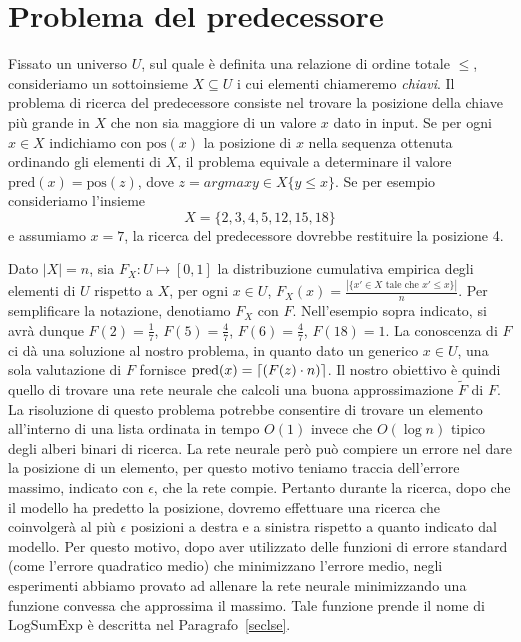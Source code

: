 \documentclass[11pt,a4paper,twoside,
openright]{book}
\DeclarePairedDelimiter{\ceil}{\lceil}{\rceil}
\begin{document}
\section{Problema del predecessore}
Fissato un universo $U$, sul quale è definita una relazione di ordine totale $\leq$, consideriamo un sottoinsieme $X \subseteq U$ i cui elementi chiameremo \emph{chiavi}. Il problema di ricerca del predecessore consiste nel trovare la posizione della chiave più grande in $X$ che non sia maggiore di un valore $x$ dato in input. Se per ogni $x \in X$ indichiamo con $\mathrm{pos}(x)$ la posizione di $x$ nella sequenza ottenuta ordinando gli elementi di $X$, il problema equivale a determinare il valore $\mathrm{pred}(x) = \mathrm{pos}(z)$, dove $z = arg max{y \in X} \{ y \leq x\}$.
Se per esempio consideriamo l'insieme $$\displaystyle{ X=\{2,3,4,5,12,15,18\}}$$ e assumiamo $x=7$, la ricerca del predecessore dovrebbe restituire la posizione 4.

Dato $|X|=n$, sia $F_X: U \mapsto [0, 1]$ la distribuzione cumulativa empirica degli elementi di $U$ rispetto a $X$, per ogni $x\in U$, $F_X(x) = \frac{| \{x' \in X \text{ tale che }x' \leq x\} |}{n}$. Per semplificare la notazione, denotiamo $F_{X}$ con $F$. Nell'esempio sopra indicato, si avrà dunque $F(2)=\frac{1}{7}$, $F(5)=\frac{4}{7}$, $F(6)=\frac{4}{7}$, $F(18)=1$. La conoscenza di $F$ ci dà una soluzione al nostro problema, in quanto dato un generico $x \in U$, una sola valutazione di $F$ fornisce $\mathrm{pred}(x) = \ceil{(F(z)\cdot n)}$. Il nostro obiettivo è quindi quello di trovare una rete neurale che calcoli una buona approssimazione $\tilde{F}$ di $F$.
La risoluzione di questo problema potrebbe consentire di trovare un elemento all'interno di una lista ordinata in tempo $O(1)$ invece che $O(\log n)$ tipico degli alberi binari di ricerca.
La rete neurale però può compiere un errore nel dare la posizione di un elemento, per questo motivo teniamo traccia dell'errore massimo, indicato con $\epsilon$, che la rete compie. Pertanto durante la ricerca, dopo che il modello ha predetto la posizione, dovremo effettuare una ricerca che coinvolgerà al più $\epsilon$ posizioni a destra e a sinistra rispetto a quanto indicato dal modello. Per questo motivo, dopo aver utilizzato delle funzioni di errore standard (come l'errore quadratico medio) che minimizzano l'errore medio, negli esperimenti abbiamo provato ad allenare la rete neurale minimizzando una funzione convessa che approssima il massimo. Tale funzione prende il nome di $\mathrm{LogSumExp}$ è descritta nel Paragrafo~\ref{seclse}.
\end{document}
